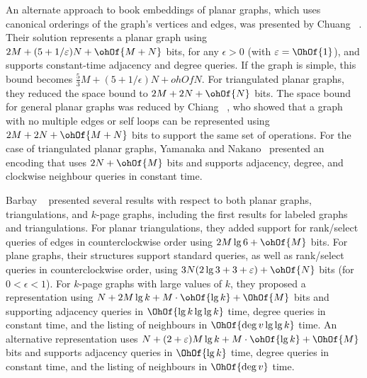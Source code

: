 An alternate approach to book embeddings of planar graphs, which uses
canonical orderings of the graph's vertices and edges, was presented
by Chuang \etal~\cite{chuang_et_al_1998}.
Their solution represents a planar graph using
$2M + (5 + 1/\epsilon)N + \ohOf{M + N}$ bits, for any $\epsilon > 0$ 
(with $\epsilon = \OhOf{1}$), and supports constant-time adjacency 
and degree queries.
If the graph is simple, this bound becomes
$\frac{5}{3}M + (5 + 1/\epsilon)N + ohOf{N}$. 
For triangulated planar graphs, they reduced the space
bound to $2M + 2N + \ohOf{N}$ bits.
The space bound for general planar graphs was reduced by Chiang
\etal~\cite{DBLP:journals/siamcomp/ChiangLL05}, who showed that a
graph with no multiple edges or self loops can be represented using
$2M + 2N + \ohOf{M + N}$ bits to support the same set of
operations.
For the case of triangulated planar graphs, Yamanaka and
Nakano~\cite{DBLP:conf/walcom/YamanakaN08} presented an encoding that
uses $2N + \ohOf{M}$ bits and supports adjacency, degree, and
clockwise neighbour queries in constant time.

Barbay \etal~\cite{DBLP:conf/isaac/BarbayAHM07} presented several
results with respect to both planar graphs, triangulations, and
$k$-page graphs, including the first results for labeled graphs and
triangulations.
For planar triangulations, they added support for
rank/select queries of edges in counterclockwise order using $2M
\lg 6 + \ohOf{M}$ bits.
For plane graphs, their structures support
standard queries, as well as rank/select queries in counterclockwise
order, using $3N(2 \lg 3 + 3 + \epsilon) + \ohOf{N}$
bits (for $0 < \epsilon < 1$).
For $k$-page graphs
with large values of $k$, they proposed a representation using $N + 2M
\lg k + M \cdot \ohOf{\lg k} + \OhOf{M}$ bits and supporting
adjacency queries in $\OhOf{\lg k \lg\lg k}$ time, degree queries in
constant time, and the listing of neighbours in $\OhOf{\deg{v} \lg\lg k}$ time.
An alternative representation uses
$N + (2 + \epsilon)M \lg k + M \cdot \ohOf{\lg k} + \OhOf{M}$ bits and
supports adjacency queries in $\OhOf{\lg k}$ time, degree queries in
constant time, and the listing of neighbours in $\OhOf{\deg{v}}$ time.

